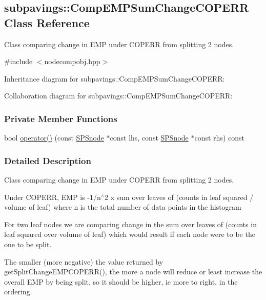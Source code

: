 \hypertarget{classsubpavings_1_1CompEMPSumChangeCOPERR}{\subsection{subpavings\-:\-:\-Comp\-E\-M\-P\-Sum\-Change\-C\-O\-P\-E\-R\-R \-Class \-Reference}
\label{classsubpavings_1_1CompEMPSumChangeCOPERR}
}


\-Class comparing change in \-E\-M\-P under \-C\-O\-P\-E\-R\-R from splitting 2 nodes.  




{\ttfamily \#include $<$nodecompobj.\-hpp$>$}



\-Inheritance diagram for subpavings\-:\-:\-Comp\-E\-M\-P\-Sum\-Change\-C\-O\-P\-E\-R\-R\-:


\-Collaboration diagram for subpavings\-:\-:\-Comp\-E\-M\-P\-Sum\-Change\-C\-O\-P\-E\-R\-R\-:
\subsubsection*{\-Private \-Member \-Functions}
\begin{DoxyCompactItemize}
\item 
bool \hyperlink{classsubpavings_1_1CompEMPSumChangeCOPERR_ac17c58f07320c227e1baf9b968445e2f}{operator()} (const \hyperlink{classsubpavings_1_1SPSnode}{\-S\-P\-Snode} $\ast$const lhs, const \hyperlink{classsubpavings_1_1SPSnode}{\-S\-P\-Snode} $\ast$const rhs) const 
\end{DoxyCompactItemize}


\subsubsection{\-Detailed \-Description}
\-Class comparing change in \-E\-M\-P under \-C\-O\-P\-E\-R\-R from splitting 2 nodes. 

\-Under \-C\-O\-P\-E\-R\-R, \-E\-M\-P is -\/1/n$^\wedge$2 x sum over leaves of (counts in leaf squared / volume of leaf) where n is the total number of data points in the histogram

\-For two leaf nodes we are comparing change in the sum over leaves of (counts in leaf squared over volume of leaf) which would result if each node were to be the one to be split.

\-The smaller (more negative) the value returned by get\-Split\-Change\-E\-M\-P\-C\-O\-P\-E\-R\-R(), the more a node will reduce or least increase the overall \-E\-M\-P by being split, so it should be higher, ie more to right, in the ordering. 

